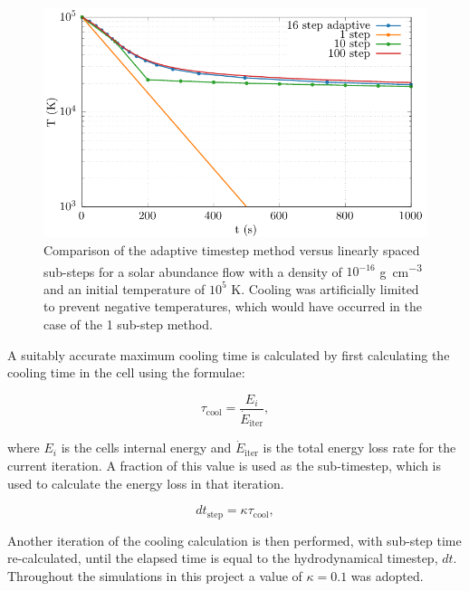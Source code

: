 \begin{figure}[h]
  \centering
  \includegraphics{assets/plasma-cooling-benchmarks/evolution.pdf}
  \caption[Cooling sub-step method evolution comparison]{Comparison of the adaptive timestep method versus linearly spaced sub-steps for a solar abundance flow with a density of $10^{-16}$ \si{\gram\per\centi\metre\cubed} and an initial temperature of $10^5$ \si{\kelvin}. Cooling was artificially limited to prevent negative temperatures, which would have occurred in the case of the 1 sub-step method.}
  \label{fig:cooling-loop-evolution}
\end{figure}

A suitably accurate maximum cooling time is calculated by first calculating the cooling time in the cell using the formulae:

\begin{equation}
  \tau_\text{cool} = \frac{E_i}{\dot{E}_\text{iter}},
\end{equation}

\noindent
where $E_i$ is the cells internal energy and $\dot{E}_\text{iter}$ is the total energy loss rate for the current iteration.
A fraction of this value is used as the sub-timestep, which is used to calculate the energy loss in that iteration.

\begin{equation}
  dt_\text{step} = \kappa \tau_\text{cool}, \label{eq:kappafirstuse}
\end{equation}

\noindent
Another iteration of the cooling calculation is then performed, with sub-step time re-calculated, until the elapsed time is equal to the hydrodynamical timestep, $dt$. Throughout the simulations in this project a value of $\kappa = 0.1$ was adopted.


